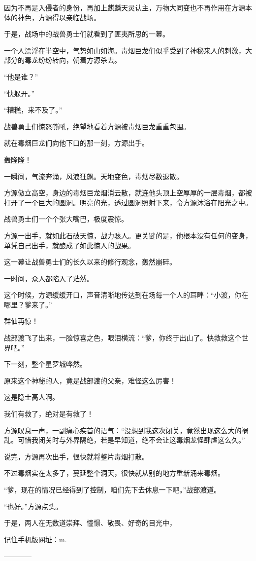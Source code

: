 \begin{this_body}
因为不再是入侵者的身份，再加上麒麟天灵认主，万物大同变也不再作用在方源本体的神色，方源得以亲临战场。

于是，战场中的战兽勇士们就看到了匪夷所思的一幕。

一个人漂浮在半空中，气势如山如海。毒烟巨龙们似乎受到了神秘来人的刺激，大部分的毒龙纷纷转向，朝着方源杀去。

“他是谁？”

“快躲开。”

“糟糕，来不及了。”

战兽勇士们惊怒嘶吼，绝望地看着方源被毒烟巨龙重重包围。

就在毒烟巨龙们向他下口的那一刻，方源出手。

轰隆隆！

一瞬间，气流奔涌，风浪狂飙。天地变色，毒烟尽数退散。

方源傲立高空，身边的毒烟巨龙烟消云散，就连他头顶上空厚厚的一层毒烟，都被打开了一个巨大的圆洞。明亮的光，透过圆洞照射下来，令方源沐浴在阳光之中。

战兽勇士们一个个张大嘴巴，极度震惊。

方源一出手，就如此石破天惊，战力骇人。更关键的是，他根本没有任何的变身，单凭自己出手，就酿成了如此惊人的战果。

这一幕让战兽勇士们的长久以来的修行观念，轰然崩碎。

一时间，众人都陷入了茫然。

这个时候，方源缓缓开口，声音清晰地传达到在场每一个人的耳畔：“小渡，你在哪里？爹来了。”

群仙再惊！

战部渡飞了出来，一脸惊喜之色，眼泪横流：“爹，你终于出山了。快救救这个世界吧。”

下一刻，整个星罗城哗然。

原来这个神秘的人，竟是战部渡的父亲，难怪这么厉害！

这是隐士高人啊。

我们有救了，绝对是有救了！

方源叹息一声，一副痛心疾首的语气：“没想到我这次闭关，竟然出现这么大的祸乱。可惜我闭关时与外界隔绝，若是早知道，绝不会让这毒烟龙怪肆虐这么久。”

说完，方源再次出手，很快就将整片毒烟打散。

不过毒烟实在太多了，蔓延整个洞天，很快就从别的地方重新涌来毒烟。

“爹，现在的情况已经得到了控制，咱们先下去休息一下吧。”战部渡道。

“也好。”方源点头。

于是，两人在无数道崇拜、憧憬、敬畏、好奇的目光中，

记住手机版网址：m.

------------

\end{this_body}


